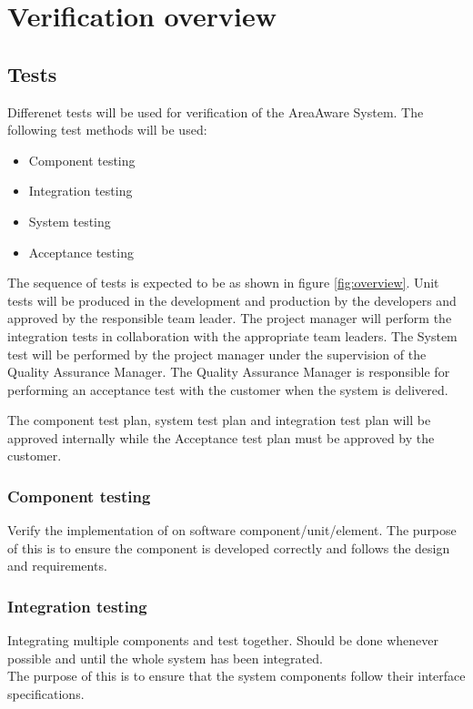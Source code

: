 \label{chp:testOverview}
\chapter{Verification overview}


\section{Tests}
Differenet tests will be used for verification of the AreaAware System. The following test methods will be used:

\begin{itemize}
	\item Component testing
	\item Integration testing
	\item System testing
	\item Acceptance testing



\end{itemize}

The sequence of tests is expected to be as shown in figure \ref{fig:overview}. Unit tests will be produced in the development and production by the developers and approved by the responsible team leader. 
The project manager will perform the integration tests in collaboration with the appropriate team leaders.
The System test will be performed by the project manager under the supervision of the Quality Assurance Manager.
The Quality Assurance Manager is responsible for performing an acceptance test with the customer when the system is delivered.



The component test plan, system test plan and integration test plan will be approved internally while the Acceptance test plan must be approved by the customer. 

\subsection{Component testing}
Verify the implementation of on software component/unit/element. The purpose of this is to ensure the component is developed correctly and follows the design and requirements. 

\subsection{Integration testing}
Integrating multiple components and test together. Should be done whenever possible and until the whole system has been integrated. \\
The purpose of this is to ensure that the system components follow their interface specifications.

